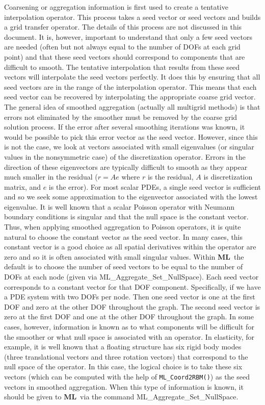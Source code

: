 \documentclass{article}[11pt]
\newcommand{\ML}     {{\bf ML}}
\begin{document}
Coarsening or aggregation information is first used to create a
tentative interpolation operator.  This process takes a seed vector or
seed vectors and builds a grid transfer operator. The details of this
process are not discussed in this document.  It is, however, important
to understand that only a few seed vectors are needed (often but not
always equal to the number of DOFs at each grid point) and that these
seed vectors should correspond to components that are difficult to
smooth.  The tentative interpolation that results from these seed
vectors will interpolate the seed vectors perfectly.  It does this by
ensuring that all seed vectors are in the range of the interpolation
operator.  This means that each seed vector can be recovered by
interpolating the appropriate coarse grid vector.  The general idea of
smoothed aggregation (actually all multigrid methods) is that errors not
eliminated by the smoother must be removed by the coarse grid solution
process.  If the error after several smoothing iterations was known, it
would be possible to pick this error vector as the seed vector. However,
since this is not the case, we look at vectors associated with small
eigenvalues (or singular values in the nonsymmetric case) of the
discretization operator.  Errors in the direction of these eigenvectors
are typically difficult to smooth as they appear much smaller in the
residual ($ r = A e $ where $r$ is the residual, $A$ is discretization
matrix, and $e$ is the error).  For most scalar PDEs, a single seed
vector is sufficient and so we seek some approximation to the
eigenvector associated with the lowest eigenvalue.  It is well known
that a scalar Poisson operator with Neumann boundary conditions is
singular and that the null space is the constant vector. Thus, when
applying smoothed aggregation to Poisson operators, it is quite natural
to choose the constant vector as the seed vector.  In many cases, this
constant vector is a good choice as all spatial derivatives within the
operator are zero and so it is often associated with small singular
values. Within \ML\ the default is to choose the number of seed vectors
to be equal to the number of DOFs at each node (given via {\sf
  ML\_Aggregate\_Set\_NullSpace}).  Each seed vector corresponds to a
constant vector for that DOF component.  Specifically, if we have a PDE
system with two DOFs per node. Then one seed vector is one at the first
DOF and zero at the other DOF throughout the graph. The second seed
vector is zero at the first DOF and one at the other DOF throughout the
graph.  In some cases, however, information is known as to what
components will be difficult for the smoother or what null space is
associated with an operator.  In elasticity, for example, it is well
known that a floating structure has six rigid body modes (three
translational vectors and three rotation vectors) that correspond to the
null space of the operator.  In this case, the logical choice is to take
these six vectors (which can be computed with the help of {\tt ML\_Coord2RBM()}) 
as the seed vectors in smoothed aggregation. When this
type of information is known, it should be given to \ML\ via the command
{\sf ML\_Aggregate\_Set\_NullSpace}.
\end{document}
